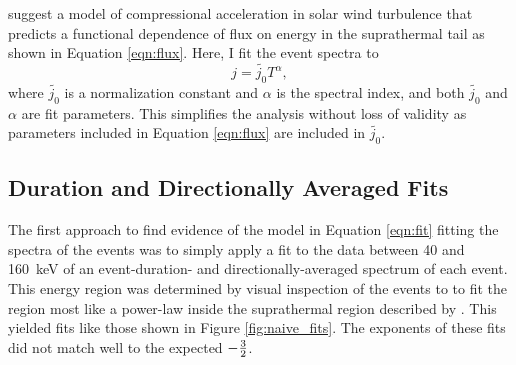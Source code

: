 \documentclass[letterpaper,11pt]{article}
\begin{document}
\citet{Fisk2008} suggest a model of compressional acceleration in solar wind turbulence that predicts a functional dependence of flux on energy in the suprathermal tail as shown in Equation \ref{eqn:flux}.  Here, I fit the event spectra to
\begin{equation}
j = \tilde{j_0} T^{\alpha},
\label{eqn:fit}
\end{equation}
where $\tilde{j_0}$ is a normalization constant and $\alpha$ is the spectral index, and both $\tilde{j_0}$ and $\alpha$ are fit parameters.  This simplifies the analysis without loss of validity as parameters included in Equation \ref{eqn:flux} are included in $\tilde{j_0}$.

\subsection{Duration and Directionally Averaged Fits}
The first approach to find evidence of the model in Equation \ref{eqn:fit} fitting the spectra of the events was to simply apply a fit to the data between 40 and \SI{160}{\kilo\electronvolt} of an event-duration- and directionally-averaged spectrum of each event.  This energy region was determined by visual inspection of the events to to fit the region most like a power-law inside the suprathermal region described by \citet{Fisk2008}. This yielded fits like those shown in Figure \ref{fig:naive_fits}.  The exponents of these fits did not match well to the expected $-{3 \over 2}$.
\end{document}

